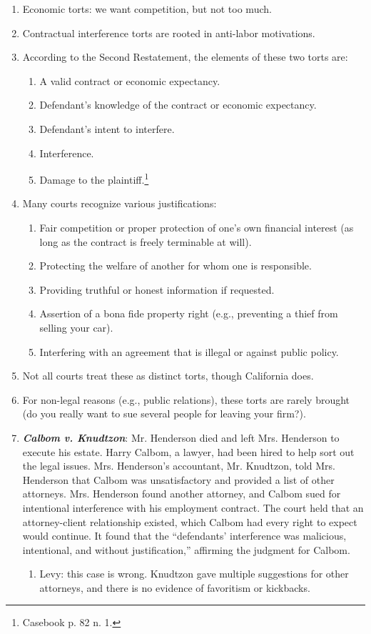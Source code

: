 \begin{enumerate}
    \item Economic torts: we want competition, but not too much.
    \item Contractual interference torts are rooted in anti-labor motivations.
    \item According to the Second Restatement, the elements of these two torts are:
    \begin{enumerate}
        \item A valid contract or economic expectancy.
        \item Defendant's knowledge of the contract or economic expectancy.
        \item Defendant's intent to interfere.
        \item Interference.
        \item Damage to the plaintiff.\footnote{Casebook p. 82 n. 1.}
    \end{enumerate}
    \item Many courts recognize various justifications:
    \begin{enumerate}
        \item Fair competition or proper protection of one's own financial interest (as long as the contract is freely terminable at will).
        \item Protecting the welfare of another for whom one is responsible.
        \item Providing truthful or honest information if requested.
        \item Assertion of a bona fide property right (e.g., preventing a thief from selling your car).
        \item Interfering with an agreement that is illegal or against public policy.
    \end{enumerate}
    \item Not all courts treat these as distinct torts, though California does.
    \item For non-legal reasons (e.g., public relations), these torts are rarely brought (do you really want to sue several people for leaving your firm?).
    \item \textbf{\emph{Calbom v. Knudtzon}}: Mr. Henderson died and left Mrs. Henderson to execute his estate. Harry Calbom, a lawyer, had been hired to help sort out the legal issues. Mrs. Henderson's accountant, Mr. Knudtzon, told Mrs. Henderson that Calbom was unsatisfactory and provided a list of other attorneys. Mrs. Henderson found another attorney, and Calbom sued for intentional interference with his employment contract. The court held that an attorney-client relationship existed, which Calbom had every right to expect would continue. It found that the ``defendants' interference was malicious, intentional, and without justification,'' affirming the judgment for Calbom.
    \begin{enumerate}
        \item Levy: this case is wrong. Knudtzon gave multiple suggestions for other attorneys, and there is no evidence of favoritism or kickbacks.
    \end{enumerate}


\end{enumerate}
